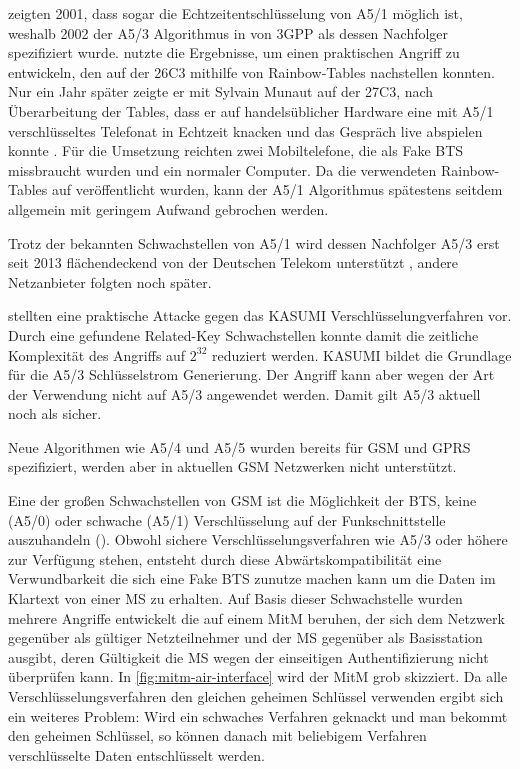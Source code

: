  zeigten 2001, dass sogar die Echtzeitentschlüsselung von A5/1 möglich ist, weshalb 2002 der A5/3 Algorithmus in \citet{3gpp:55.216} von \ac{3GPP} als dessen Nachfolger spezifiziert wurde. \citet{hulton2008intercepting} nutzte die Ergebnisse, um einen praktischen Angriff zu entwickeln, den \citet{nohl2009gsm} auf der 26C3 mithilfe von Rainbow-Tables nachstellen konnten. Nur ein Jahr später zeigte er mit Sylvain Munaut auf der 27C3, nach Überarbeitung der Tables, dass er auf handelsüblicher Hardware  eine mit A5/1 verschlüsseltes Telefonat in Echtzeit knacken und das Gespräch live abspielen konnte \citep{nohl2010wideband}. Für die Umsetzung reichten zwei Mobiltelefone, die als Fake \ac{BTS} missbraucht wurden und ein normaler Computer. Da die verwendeten Rainbow-Tables auf \citet{SRLabs:a51-tables} veröffentlicht wurden, kann der A5/1 Algorithmus spätestens seitdem allgemein mit geringem Aufwand gebrochen werden.

Trotz der bekannten Schwachstellen von A5/1 wird dessen Nachfolger A5/3 erst seit 2013 flächendeckend von der Deutschen Telekom unterstützt \citep{telekom:a53-gsm}, andere Netzanbieter folgten noch später.

\citet{dunkelman2010practical} stellten eine praktische Attacke gegen das KASUMI Verschlüsselungverfahren vor. Durch eine gefundene Related-Key Schwachstellen konnte damit die zeitliche Komplexität des Angriffs auf $2^{32}$ reduziert werden. KASUMI bildet die Grundlage für die A5/3 Schlüsselstrom Generierung. Der Angriff kann aber wegen der Art der Verwendung nicht auf A5/3 angewendet werden. Damit gilt A5/3 aktuell noch als sicher. 

Neue Algorithmen wie A5/4  und A5/5  wurden bereits für \ac{GSM} und \ac{GPRS} spezifiziert, werden aber in aktuellen \ac{GSM} Netzwerken nicht unterstützt.

Eine der großen Schwachstellen von \ac{GSM} ist die Möglichkeit der \ac{BTS}, keine (A5/0) oder schwache (A5/1) Verschlüsselung auf der Funkschnittstelle auszuhandeln (). Obwohl sichere Verschlüsselungsverfahren wie A5/3 oder höhere zur Verfügung stehen, entsteht durch diese Abwärtskompatibilität eine Verwundbarkeit die sich eine Fake \ac{BTS} zunutze machen kann um die Daten im Klartext von einer \ac{MS} zu erhalten. Auf Basis dieser Schwachstelle wurden mehrere Angriffe entwickelt die auf einem \ac{MitM} beruhen, der sich dem Netzwerk gegenüber als gültiger Netzteilnehmer und der \ac{MS} gegenüber als Basisstation ausgibt, deren Gültigkeit die \ac{MS} wegen der einseitigen Authentifizierung nicht überprüfen kann. In \autoref{fig:mitm-air-interface} wird der \ac{MitM} grob skizziert. Da alle Verschlüsselungsverfahren den gleichen geheimen Schlüssel verwenden ergibt sich ein weiteres Problem: Wird ein schwaches Verfahren geknackt und man bekommt den geheimen Schlüssel, so können danach mit beliebigem Verfahren verschlüsselte Daten entschlüsselt werden. 

